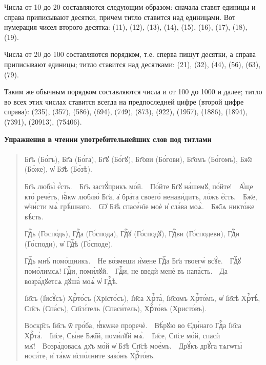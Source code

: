 \documentclass[11pt,a4paper,oneside]{memoir}
\newcommand{\exercise}{}
\newcommand{\exquote}{quote}
\newcommand{\pstyle}{\textenglish}
\newcommand{\pxp}[1]{\pstyle{(}#1\pstyle{)}}
\newcommand{\sdash}{\textenglish{\textemdash}}
\begin{document}
Числа от 10 до 20 составляются следующим образом: сначала ставят единицы и справа приписывают десятки, причем титло ставится над единицами. Вот нумерация чисел второго десятка: {} (11), {} (12), {} (13), {} (14), {} (15), {} (16), {} (17), {} (18), {} (19).

Числа от 20 до 100 составляются порядком, т.е. сперва пишут десятки, а справа приписывают единицы; титло ставится над десятками: {} (21), {} (32), {} (44), {} (56), {} (63), {} (79).

Таким же обычным порядком составляются числа и от 100 до 1000 и далее; титло во всех этих числах ставится всегда на предпоследней цифре (второй цифре справа): {} (235), {} (357), {} (586), {} (694), {} (749), {} (873), {} (922), {} (1957), {} (1886), {} (1894), {} (7391), {} (20913), {} (75406).
\bigskip
\pagebreak

\textbf{Упражнения в чтении употребительнейших слов под титлами}

\paragraph{\exercise}

\begin{\exquote}\begin{slv}
		Бг҃ъ \pxp{Бо́гъ}, Бг҃а \pxp{Бо́га}, Бг҃ꙋ \pxp{Бо́гꙋ}, Бг҃ови \pxp{Бо́гови}, Бг҃омъ \pxp{Бо́гомъ}, Бж҃е \pxp{Бо́же}, ѡ҆ Бз҃ѣ \pxp{Бо́зѣ}.

		Бг҃ъ любы̀ є҆́сть.~\sdash~Бг҃ъ застꙋ́прикъ мо́й.~\sdash~По́йте Бг҃ꙋ на́шемꙋ, по́йте!~\sdash~А҆́ще кто̀ рече́тъ, ꙗ҆́кѡ люблю̀ Бг҃а, а҆ бра́та своего̀ ненави́дитъ, ло́жъ є҆́сть.~\sdash~Бж҃е, ѡ҆чи́сти мѧ̀ грѣ́шнаго.~\sdash~Ѡ҆ Бз҃ѣ спасе́нїе моѐ и҆ сла́ва моѧ̀.~\sdash~Бж҃їѧ никто́же вѣ́сть.

		Гдⷭ҇ь \pxp{Госпо́дь}, Гдⷭ҇а \pxp{Го́спода}, Гдⷭ҇ꙋ \pxp{Го́сподꙋ}, Гдⷭ҇ви \pxp{Го́сподеви}, Гдⷭ҇и \pxp{Го́споди}, ѡ҆ Гдⷭ҇ѣ \pxp{Го́споде}.

		Гдⷭ҇ь мнѣ̀ помо́щникъ.~\sdash~Не во́змеши и҆́мене Гдⷭ҇а Бг҃а твоегѡ̀ всꙋ́е.~\sdash~Гдⷭ҇ꙋ помо́лимсѧ! Гдⷭ҇и, поми́лꙋй.~\sdash~Гдⷭ҇и, не введѝ менѐ въ напа́сть.~\sdash~Да возра́дꙋетсѧ дꙋша̀ моѧ̀ ѡ҆ Гдⷭ҇ѣ.

		І҆и҃съ \pxp{І҆исꙋ̀съ} Хрⷭ҇то́съ \pxp{Хрїсто́съ}, І҆и҃са Хрⷭ҇та̀, І҆и҃сомъ Хрⷭ҇то́мъ, ѡ҆ І҆и҃сѣ Хрⷭ҇тѣ̀, Сп҃съ \pxp{Спа́съ}, Сп҃си́тель \pxp{Спаси́тель}, Хрⷭ҇то́въ \pxp{Христо́въ}.

		Воскр҃съ І҆и҃съ ѿ гро́ба, ꙗ҆́кѡже проречѐ.~\sdash~Вѣ́рꙋю во Є҆ди́наго Гдⷭ҇а І҆и҃са Хрⷭ҇та̀.~\sdash~І҆и҃се, Сы́не Бж҃їй, поми́лꙋй мѧ̀.~\sdash~І҆и҃се, Сп҃се мо́й, спасѝ мѧ҃!~\sdash~Возра́довасѧ дх҃ъ мо́й ѡ҆ Бз҃ѣ Сп҃сѣ мое́мъ.~\sdash~Дрꙋ́къ дрꙋ́га тѧгѡты̀ носи́те, и҆ та́кѡ и҆спо́лните зако́нъ Хрⷭ҇то́въ.
	\end{slv}\end{\exquote}
\end{document}
